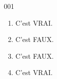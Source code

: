 \begin{corrige}{001}
\begin{enumerate}
\item C'est VRAI.
\item C'est FAUX.
\item C'est FAUX.
\item C'est VRAI.
\end{enumerate}
\end{corrige}



